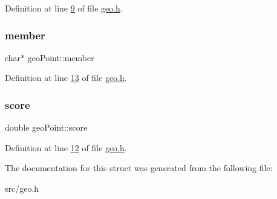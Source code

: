 Definition at line \hyperlink{geo_8h_source_l00009}{9} of file \hyperlink{geo_8h_source}{geo.\+h}.

\mbox{\label{structgeoPoint_ad123c77a7663d8ab264e1b02620c8074}} 
\subsubsection{\texorpdfstring{member}{member}}
{\footnotesize\ttfamily char$\ast$ geo\+Point\+::member}



Definition at line \hyperlink{geo_8h_source_l00013}{13} of file \hyperlink{geo_8h_source}{geo.\+h}.

\mbox{\label{structgeoPoint_a573049108ad5c8467bd9f0b42dd05d71}} 
\subsubsection{\texorpdfstring{score}{score}}
{\footnotesize\ttfamily double geo\+Point\+::score}



Definition at line \hyperlink{geo_8h_source_l00012}{12} of file \hyperlink{geo_8h_source}{geo.\+h}.



The documentation for this struct was generated from the following file\+:\begin{DoxyCompactItemize}
\item 
src/geo.\+h\end{DoxyCompactItemize}
